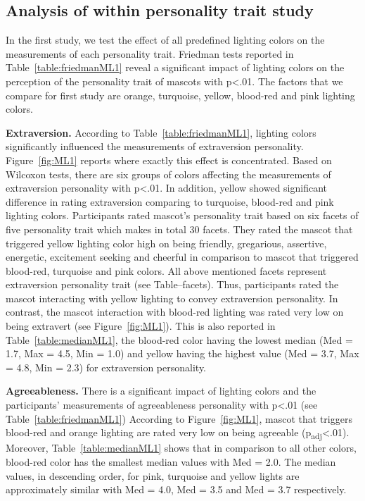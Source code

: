 \subsection{Analysis of within personality trait study}
\label{subsec:MLstudy1}
In the first study, we test the effect of all predefined lighting colors
on the measurements of each personality trait.
Friedman tests reported in Table~\ref{table:friedmanML1} reveal a significant impact
of lighting colors on the perception of the personality trait of mascots with p<.01.
The factors that we compare for first study are orange, turquoise, yellow, blood-red and pink lighting colors.

\par\textbf{Extraversion.}
According to Table~\ref{table:friedmanML1}, lighting colors significantly
influenced the measurements of extraversion personality.
Figure~\ref{fig:ML1} reports where exactly this effect is concentrated.
Based on Wilcoxon tests, there are six groups of colors affecting the
measurements of extraversion personality with p<.01.
In addition, yellow showed significant difference in rating extraversion
comparing to turquoise, blood-red and pink lighting colors.
Participants rated mascot's personality trait based on six facets of five
personality trait which makes in total 30 facets.
They rated the mascot that triggered yellow lighting color high on being
friendly, gregarious, assertive, energetic, excitement seeking and
cheerful in comparison to mascot that triggered blood-red, turquoise and pink colors.
All above mentioned facets represent extraversion personality trait (see Table--facets).
Thus, participants rated the mascot interacting with yellow lighting to convey extraversion personality.
In contrast, the mascot interaction with blood-red lighting was
rated very low on being extravert (see Figure~\ref{fig:ML1}).
This is also reported in Table~\ref{table:medianML1}, the blood-red color having
the lowest median (Med = 1.7, Max = 4.5, Min = 1.0) and yellow having the highest
value (Med = 3.7, Max = 4.8, Min = 2.3) for extraversion personality.

\par\textbf{Agreeableness.}
There is a significant impact of lighting colors and the participants'
measurements of agreeableness personality with p<.01 (see Table~\ref{table:friedmanML1})
According to Figure~\ref{fig:ML1}, mascot that triggers blood-red and orange lighting
are rated very low on being agreeable (p\textsubscript{adj}<.01).
Moreover, Table~\ref{table:medianML1} shows that in comparison to all other colors,
blood-red color has the smallest median values with Med = 2.0.
The median values, in descending order, for pink, turquoise and yellow lights are
approximately similar with Med = 4.0, Med = 3.5 and Med = 3.7 respectively.


